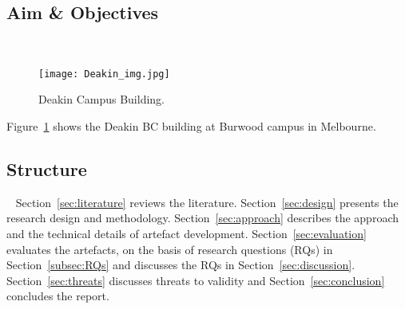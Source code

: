 \subsection{Aim \& Objectives}~\label{subsec:aims}

\begin{figure}[h]
    \centering
    \texttt{[image: Deakin\_img.jpg]}
    \caption{Deakin Campus Building.}
    \label{fig:building}
\end{figure}

Figure~\ref{fig:building} shows the Deakin BC building at Burwood campus in Melbourne.

\subsection{Structure}~\label{subsec:structure}
Section~\ref{sec:literature} reviews the literature. Section~\ref{sec:design} presents the research design and methodology. Section~\ref{sec:approach} describes the approach and the technical details of artefact development. Section~\ref{sec:evaluation} evaluates the artefacts, on the basis of research questions (RQs) in Section~\ref{subsec:RQs} and discusses the RQs in Section~\ref{sec:discussion}. Section~\ref{sec:threats} discusses threats to validity and Section~\ref{sec:conclusion} concludes the report. 